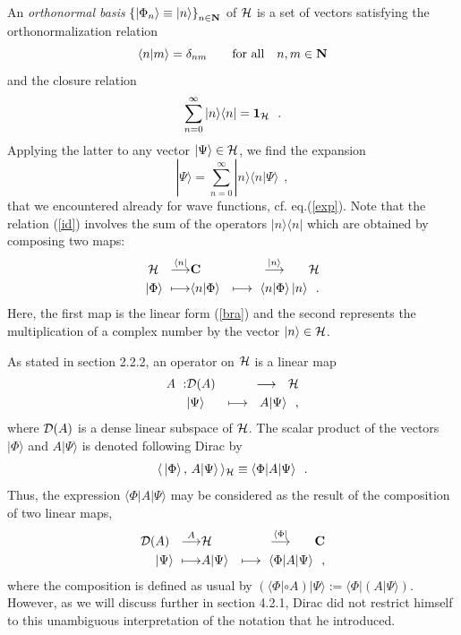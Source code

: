 \documentclass[a4wide,12pt]{report}
\begin{document}
An {\em orthonormal basis} 
$\left\{ | \Phi_n \rangle \equiv |n\rangle \right\}_{n\in {\bf N}}$
 of ${\cal H}$ is a set of vectors satisfying the orthonormalization 
 relation 
 \begin{equation}
\langle n | m \rangle = \delta_{nm}
\qquad \mbox{for all} \quad n,m \in {\bf N}
\end{equation}
and the closure relation 
\begin{equation}
\label{id}
\sum_{n=0}^{\infty} | n \rangle \langle n | =  {\bf 1}_{{\cal H}}
\ \ .
\end{equation}
Applying the latter to any vector $| \Psi \rangle \in {\cal H}$, 
we find the expansion 
\[
| \Psi \rangle = \sum_{n=0}^{\infty} | n \rangle 
\langle n | \Psi \rangle
\ \ ,
\]
that we encountered 
already for wave functions, cf. eq.(\ref{exp}).
Note that the relation (\ref{id}) 
involves the sum of the operators 
$| n \rangle \langle n |$ 
which are obtained by composing two maps: 
\begin{eqnarray}
\label{de}
{\cal H} \ \ \stackrel{\langle n|}{\longrightarrow} & {\bf C}&
\stackrel{|n \rangle}{\longrightarrow} \quad \ \ {\cal H}
\\
| \Phi \rangle \ \longmapsto & \langle n | \Phi \rangle &
\longmapsto \
\langle n | \Phi \rangle \,  |n \rangle
\ \ .
\nonumber
\end{eqnarray}
Here, the first map is the linear form 
(\ref{bra}) and the second represents the multiplication of a complex
number by the vector $|n\rangle \in {\cal H}$.
 
As stated in section 2.2.2, 
an operator on ${\cal H}$ is a linear map 
\begin{eqnarray}
A \ : & {\cal D} (A) & \longrightarrow \ \ {\cal H}
\\
 & |\Psi \rangle & \longmapsto \ \
A | \Psi \rangle
\ \ ,
\nonumber
\end{eqnarray}
 where ${\cal D}(A)$ 
is a dense linear subspace of ${\cal H}$.
The scalar product of the vectors 
$|\Phi \rangle$ and $A | \Psi
\rangle$ is denoted following Dirac by 
\begin{equation}
\label{mat}
\langle \, | \Phi \rangle \, ,\, A|\Psi \rangle \, \rangle _{{\cal H}} \equiv
\langle \Phi | A | \Psi \rangle
\ \ .
\end{equation}
Thus, the expression $\langle \Phi | A | \Psi \rangle$ 
may be considered as the result of the 
composition of two linear maps, 
\begin{eqnarray}
\label{copo}
{\cal D} (A) \ \ \stackrel{A}{\longrightarrow} & {\cal H} &
\stackrel{\langle \Phi |}{\longrightarrow} \quad \ \ {\bf C}
\\
| \Psi \rangle \ \longmapsto & A | \Psi \rangle &
\longmapsto \
\langle \Phi | A | \Psi \rangle
\ \ ,
\nonumber
\end{eqnarray}
where the composition is defined as usual by 
$\left( \langle \Phi | \circ A \right)  | \Psi \rangle :=
\langle \Phi | \left(  A   | \Psi \rangle \right)$.
However, as we will discuss further in section 4.2.1,
Dirac did not restrict himself to 
this unambiguous 
interpretation of the notation 
that he introduced.
\end{document}
